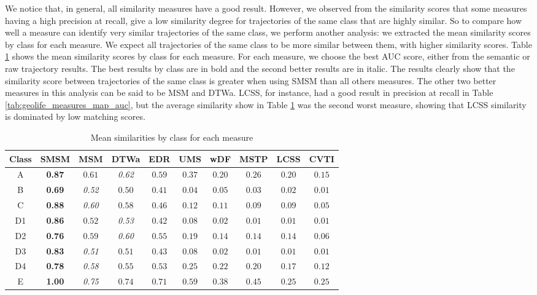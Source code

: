 \documentclass[12pt]{article}
\begin{document}
We notice that, in general, all similarity measures have a good result. However, we observed from the similarity scores that some measures having a high precision at recall, give a low similarity degree for trajectories of the same class that are highly similar. So to compare how well a measure can identify very similar trajectories of the same class, we perform another analysis: we extracted the mean similarity scores by class for each measure. We expect  all trajectories of the same class to be more similar between them, with higher similarity scores.
Table \ref{tab:geolife_similaritymeans} shows the mean similarity scores by class for each measure. For each measure, we choose the best AUC score, either from the semantic or raw trajectory results. The best results by class are in bold and the second better results are in italic. The results clearly show that the similarity score between trajectories of the same class is greater when using SMSM than all others measures. The other two better measures in this analysis can be said to be MSM and DTWa. LCSS, for instance, had a good result in precision at recall in Table \ref{tab:geolife_measures_map_auc}, but the average similarity show in Table \ref{tab:geolife_similaritymeans} was the second worst measure, showing that LCSS similarity is dominated by low matching scores.

\begin{table}[ht!]
\footnotesize
  \centering
  \begin{tabular}{|c|c|c|c|c|c|c|c|c|c|}
  	\hline
 Class & SMSM & MSM & DTWa & EDR & UMS & wDF & MSTP & LCSS & CVTI \\
  	\hline
 A & \textbf{0.87} & $0.61$ & \textit{0.62} & $ 0.59$ & $0.37$ & $0.20$& $0.26$ & $0.20$ & $0.15$  \\
 B & \textbf{0.69} & \textit{0.52} & $0.50$ & $ 0.41$ & $0.04$ & $0.05$& $0.03$ & $0.02$ & $0.01$ \\
 C & \textbf{0.88} & \textit{0.60} & $0.58$ & $ 0.46$ & $0.12$ & $0.11$& $0.09$ & $0.09$ & $0.05$ \\
D1 & \textbf{0.86} & $0.52$ & \textit{0.53} & $ 0.42$ & $0.08$ & $0.02$& $0.01$ & $0.01$ & $0.01$ \\
D2 & \textbf{0.76} & $0.59$ & \textit{0.60} & $ 0.55$ & $0.19$ & $0.14$& $0.14$ & $0.14$ & $0.06$ \\
D3 & \textbf{0.83} & \textit{0.51} & $0.51$ & $ 0.43$ & $0.08$ & $0.02$& $0.01$ & $0.01$ & $0.01$ \\
D4 & \textbf{0.78} & \textit{0.58} & $0.55$ & $ 0.53$ & $0.25$ & $0.22$& $0.20$ & $0.17$ & $0.12$ \\
E  & \textbf{1.00} & \textit{0.75} & $0.74$ & $ 0.71$ & $0.59$ & $0.38$& $0.45$ & $0.25$ & $0.25$ \\
    \hline
  \end{tabular}
  \caption{Mean similarities by class for each measure}
  \label{tab:geolife_similaritymeans}
\end{table}
\end{document}
